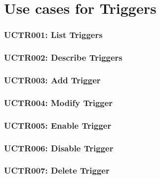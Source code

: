 \section{Use cases for Triggers}

\subsubsection{UCTR001: List Triggers}
\label{UCTR001}

\subsubsection{UCTR002: Describe Triggers}
\label{UCTR002}

\subsubsection{UCTR003: Add Trigger}
\label{UCTR003}

\subsubsection{UCTR004: Modify Trigger}
\label{UCTR004}

\subsubsection{UCTR005: Enable Trigger}
\label{UCTR005}

\subsubsection{UCTR006: Disable Trigger}
\label{UCTR006}

\subsubsection{UCTR007: Delete Trigger}
\label{UCTR007}